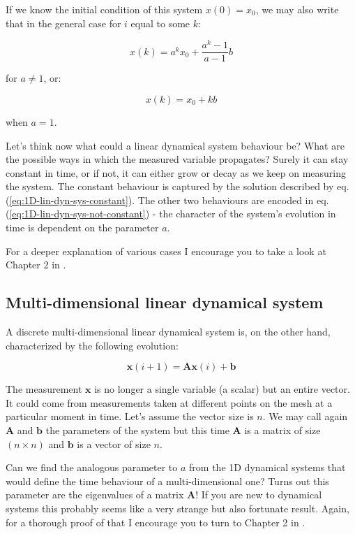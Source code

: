 \documentclass[10pt,twocolumn]{article}
\begin{document}
If we know the initial condition of this system $x(0) = x_0$, we may also write that in the general case for $i$ equal to some $k$:

\begin{equation} \label{eq:1D-lin-dyn-sys-not-constant}
x(k) = a^k x_0 + \frac{a^k - 1}{a - 1} b
\end{equation}

for $a \neq 1$, or:

\begin{equation} \label{eq:1D-lin-dyn-sys-constant}
x(k) = x_0 + k b
\end{equation}

when $a = 1$.

Let's think now what could a linear dynamical system behaviour be? What are the possible ways in which the measured variable propagates? Surely it can stay constant in time, or if not, it can either grow or decay as we keep on measuring the system. The constant behaviour is captured by the solution described by eq.(\ref{eq:1D-lin-dyn-sys-constant}). The other two behaviours are encoded in eq.(\ref{eq:1D-lin-dyn-sys-not-constant}) - the character of the system's evolution in time is dependent on the parameter $a$.

For a deeper explanation of various cases I encourage you to take a look at Chapter 2 in \cite{Prof_Edward_Scheinerman}.

\subsection{Multi-dimensional linear dynamical system}

A discrete multi-dimensional linear dynamical system is, on the other hand, characterized by the following evolution:

\begin{equation}
\mathbf{x}(i+1) = \mathbf{A} \mathbf{x}(i) + \mathbf{b}
\end{equation}

The measurement $\mathbf{x}$ is no longer a single variable (a scalar) but an entire vector. It could come from measurements taken at different points on the mesh at a particular moment in time. Let's assume the vector size is $n$. We may call again $\mathbf{A}$ and $\mathbf{b}$ the parameters of the system but this time $\mathbf{A}$ is a matrix of size $(n \times n)$ and $\mathbf{b}$ is a vector of size $n$.

Can we find the analogous parameter to $a$ from the 1D dynamical systems that would define the time behaviour of a multi-dimensional one? Turns out this parameter are the eigenvalues of a matrix $\mathbf{A}$! If you are new to dynamical systems this probably seems like a very strange but also fortunate result. Again, for a thorough proof of that I encourage you to turn to Chapter 2 in \cite{Prof_Edward_Scheinerman}.
\end{document}
